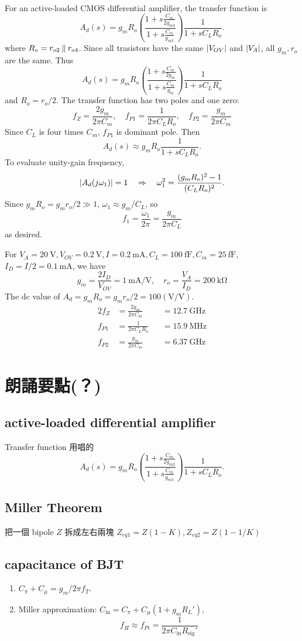 \documentclass[12pt, a4paper]{article}
\begin{document}
\Ans \\
For an active-loaded CMOS differential amplifier, the transfer function is
\[
  A_d(s) = g_mR_o\left(\frac{1+s\frac{C_m}{2g_{m3}}}{1+s\frac{C_m}{g_{m3}}}\right)
      \frac{1}{1+sC_LR_o}.
\]
where $R_o = r_{o2} \mathbin{\|} r_{o4}$.
Since all trasistors have the same $\lvert V_{OV}\rvert$ and $\lvert V_A\rvert$, all
$g_m, r_o$ are the same. Thus
\[
  A_d(s) = g_mR_o\left(\frac{1+s\frac{C_m}{2g_m}}{1+s\frac{C_m}{g_m}}\right)
      \frac{1}{1+sC_LR_o}
\]
and $R_o = r_o / 2$. The transfer function has two poles and one zero:
\[
  f_Z = \frac{2g_m}{2\pi C_m}, \quad
  f_{P1} = \frac{1}{2\pi C_LR_o}, \quad
  f_{P2} = \frac{g_m}{2\pi C_m}
\]
Since $C_L$ is four times $C_m$, $f_{P1}$ is dominant pole. Then
\[
  A_d(s) \approx g_mR_o \frac{1}{1+sC_LR_o}.
\]
To evaluate unity-gain frequency,
\[
  \lvert A_d(j\omega_1)\rvert = 1 \quad \Rightarrow \quad
  \omega_1^2 = \frac{(g_mR_o)^2 - 1}{(C_LR_o)^2}.
\]
Since $g_mR_o = g_mr_o/2 \gg 1$, $\omega_1 \approx g_m/C_L$, so
\[
  f_1 = \frac{\omega_1}{2\pi} = \frac{g_m}{2\pi C_L}
\]
as desired.

For $V_A=\SI{20}{\V}, V_{OV}=\SI{0.2}{\V}, I=\SI{0.2}{\mA},
C_L=\SI{100}{\fF},C_m=\SI{25}{\fF}$, $I_D = I/2=\SI{0.1}{\mA}$, we have
\[
  g_m = \frac{2I_D}{V_{OV}} = \SI{1}{\mA/\V}, \quad
  r_o = \frac{V_A}{I_D} = \SI{200}{\kohm}
\]
The dc value of $A_d = g_mR_o = g_mr_o/2 = 100(\si{\V/\V})$.
\begin{alignat*}{2}
  f_Z &= \frac{2g_m}{2\pi C_m} & &= \SI{12.7}{\GHz} \\
  f_{P1} &= \frac{1}{2\pi C_LR_o} & &= \SI{15.9}{\MHz} \\
  f_{P2} &= \frac{g_m}{2\pi C_m} & &= \SI{6.37}{\GHz}
\end{alignat*}

\section{朗誦要點(？)}
\subsection{active-loaded differential amplifier}
Transfer function 用唱的
\[
  A_d(s) = g_mR_o\left(\frac{1+s\frac{C_m}{2g_{m3}}}{1+s\frac{C_m}{g_{m3}}}\right)
      \frac{1}{1+sC_LR_o}.
\]
\subsection{Miller Theorem}
把一個 bipole $Z$ 拆成左右兩塊
$Z_{eq1} = Z (1-K), Z_{eq2} = Z (1 - 1/K)$
\subsection{capacitance of BJT}
\begin{enumerate}
  \item $C_\pi + C_\mu = g_m / 2\pi f_T$.
  \item Miller approximation: $C_\text{in} = C_\pi + C_\mu(1 + g_mR_L')$,
    \[ f_H \approx f_{Pi} = \frac{1}{2\pi C_\text{in} R_\text{sig}'} \]
\end{enumerate}
\end{document}
